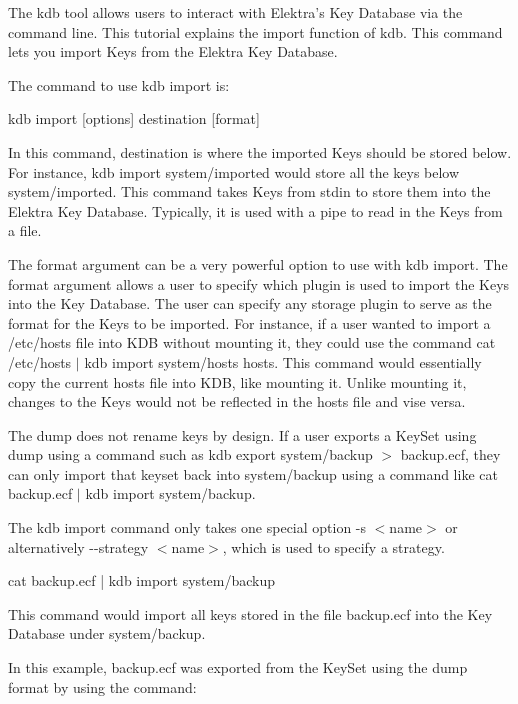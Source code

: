 The kdb tool allows users to interact with Elektra’s Key Database via the command line. This tutorial explains the import function of kdb. This command lets you import Keys from the Elektra Key Database.

The command to use kdb import is\+:


\begin{DoxyCode}
kdb import [options] destination [format]
\end{DoxyCode}


In this command, {\ttfamily destination} is where the imported Keys should be stored below. For instance, {\ttfamily kdb import system/imported} would store all the keys below {\ttfamily system/imported}. This command takes Keys from {\ttfamily stdin} to store them into the Elektra Key Database. Typically, it is used with a pipe to read in the Keys from a file.

The format argument can be a very powerful option to use with kdb import. The format argument allows a user to specify which plugin is used to import the Keys into the Key Database. The user can specify any storage plugin to serve as the format for the Keys to be imported. For instance, if a user wanted to import a {\ttfamily /etc/hosts} file into K\+DB without mounting it, they could use the command {\ttfamily cat /etc/hosts $\vert$ kdb import system/hosts hosts}. This command would essentially copy the current hosts file into K\+DB, like mounting it. Unlike mounting it, changes to the Keys would not be reflected in the hosts file and vise versa.

The dump does not rename keys by design. If a user exports a Key\+Set using dump using a command such as {\ttfamily kdb export system/backup $>$ backup.\+ecf}, they can only import that keyset back into {\ttfamily system/backup} using a command like {\ttfamily cat backup.\+ecf $\vert$ kdb import system/backup}.

The kdb import command only takes one special option {\ttfamily -\/s $<$name$>$} or alternatively {\ttfamily -\/-\/strategy $<$name$>$}, which is used to specify a strategy.


\begin{DoxyCode}
cat backup.ecf | kdb import system/backup
\end{DoxyCode}


This command would import all keys stored in the file {\ttfamily backup.\+ecf} into the Key Database under {\ttfamily system/backup}.

In this example, {\ttfamily backup.\+ecf} was exported from the Key\+Set using the dump format by using the command\+:


